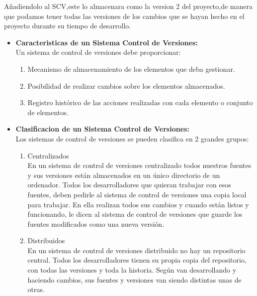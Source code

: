 \begin{itemize}
Añadiendolo al SCV,este lo almacenara como la version 2 del proyecto,de manera que podamos tener todas las versiones de los cambios que se hayan hecho en el proyecto durante su tiempo de desarrollo.\\
\end{itemize} 


\begin{itemize}
\item \textbf{Caracteristicas de un Sistema Control de Versiones:} \\

Un sistema de control de versiones debe proporcionar:\\

\begin{enumerate}[1.] %
\item Mecanismo de almacenamiento de los elementos que deba gestionar.
\item Posibilidad de realizar cambios sobre los elementos almacenados.
\item Registro histórico de las acciones realizadas con cada elemento o conjunto de elementos.\\
\end{enumerate}
\end{itemize} 


\begin{itemize}
\item \textbf{Clasificacion de un Sistema Control de Versiones:} \\

Los sistemas de control de versiones se pueden clasifica en 2 grandes grupos:\\

\begin{enumerate}[1.] %
\item Centralizados\\

En un sistema de control de versiones centralizado todos nuestros fuentes y sus versiones están almacenados en un único directorio de un ordenador. Todos los desarrolladores que quieran trabajar con esos fuentes, deben pedirle al sistema de control de versiones una copia local para trabajar. En ella realizan todos sus cambios y cuando están listos y funcionando, le dicen al sistema de control de versiones que guarde los fuentes modificados como una nueva versión.\\

\item Distribuidos\\

En un sistema de control de versiones distribuido no hay un repositorio central. Todos los desarrolladores tienen su propia copia del repositorio, con todas las versiones y toda la historia. Según van desarrollando y haciendo cambios, sus fuentes y versiones van siendo distintas unas de otras.\\
\end{enumerate}
\end{itemize} 


